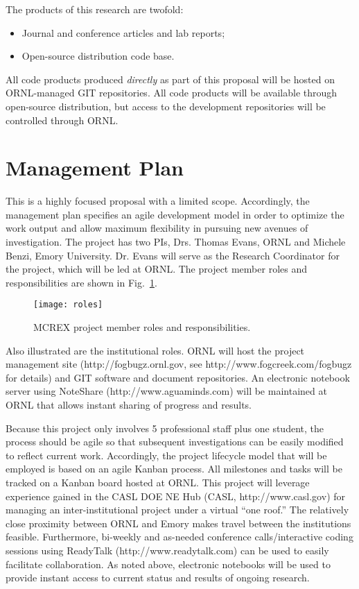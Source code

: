 The products of this research are twofold:
\begin{itemize}
  \parskip = -2pt
\item Journal and conference articles and lab reports;
\item Open-source distribution code base.
\end{itemize}
All code products produced \textit{directly} as part of this proposal will be
hosted on ORNL-managed GIT repositories.  All code products will be available
through open-source distribution, but access to the development repositories
will be controlled through ORNL.


\section{Management Plan}
\label{sec:management-plan}
 
This is a highly focused proposal with a limited scope. Accordingly, the
management plan specifies an agile development model in order to optimize the
work output and allow maximum flexibility in pursuing new avenues of
investigation.  The project has two PIs, Drs. Thomas Evans, ORNL and Michele
Benzi, Emory University.  Dr. Evans will serve as the Research Coordinator for
the project, which will be led at ORNL.  The project member roles and
responsibilities are shown in Fig.~\ref{fig:roles}.
\begin{figure}[ht]
  \begin{center}
    \texttt{[image: roles]}
  \end{center}
  \caption{MCREX project  member roles and responsibilities.}
  \label{fig:roles}
\end{figure}
Also illustrated are the institutional roles.  ORNL will host the project
management site (\textsf{http://fogbugz.ornl.gov}, see
\textsf{http://www.fogcreek.com/fogbugz} for details) and GIT software and
document repositories.  An electronic notebook server using NoteShare
(\textsf{http://www.aguaminds.com}) will be maintained at ORNL that allows
instant sharing of progress and results.

Because this project only involves 5 professional staff plus one student, the
process should be agile so that subsequent investigations can be easily
modified to reflect current work.  Accordingly, the project lifecycle model
that will be employed is based on an agile Kanban\cite{Kniberg:2010wx}
process. All milestones and tasks will be tracked on a Kanban board hosted at
ORNL.  This project will leverage experience gained in the CASL DOE NE Hub
(CASL, \textsf{http://www.casl.gov}) for managing an inter-institutional
project under a virtual ``one roof.''  The relatively close proximity between
ORNL and Emory makes travel between the institutions feasible.  Furthermore,
bi-weekly and as-needed conference calls/interactive coding sessions using
ReadyTalk (\textsf{http://www.readytalk.com}) can be used to easily facilitate
collaboration.  As noted above, electronic notebooks will be used to provide
instant access to current status and results of ongoing research.

